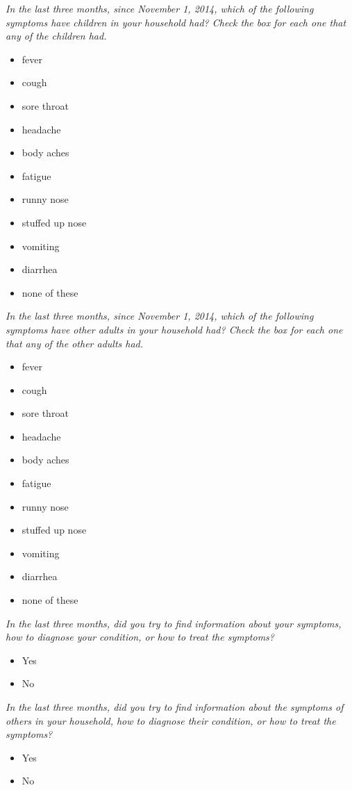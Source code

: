 \documentclass[12pt]{article}
\begin{document}
\emph{In the last three months, since November 1, 2014, which of the following symptoms have children in your household had? Check the box for each one that any of the children had.}
\begin{itemize}
\item fever
\item cough
\item sore throat
\item headache
\item body aches
\item fatigue
\item runny nose
\item stuffed up nose
\item vomiting
\item diarrhea
\item none of these
\end{itemize}

\emph{In the last three months, since November 1, 2014, which of the following symptoms have other adults in your household had? Check the box for each one that any of the other adults had.}
\begin{itemize}
\item fever
\item cough
\item sore throat
\item headache
\item body aches
\item fatigue
\item runny nose
\item stuffed up nose
\item vomiting
\item diarrhea
\item none of these
\end{itemize}

\emph{In the last three months, did you try to find information about your symptoms, how to diagnose your condition, or how to treat the symptoms?}
\begin{itemize}
\item Yes
\item No
\end{itemize}

\emph{In the last three months, did you try to find information about the symptoms of others in your household, how to diagnose their condition, or how to treat the symptoms?}
\begin{itemize}
\item Yes
\item No
\end{itemize}
\end{document}

